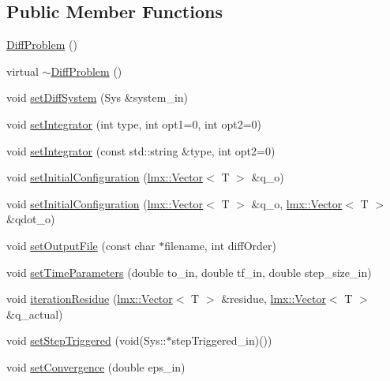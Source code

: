 \subsection*{Public Member Functions}
\begin{DoxyCompactItemize}
\item 
\hyperlink{classlmx_1_1DiffProblem_a33d21e901331098181a7403e22694058}{Diff\-Problem} ()
\item 
virtual \hyperlink{classlmx_1_1DiffProblem_a80661c86ad22e8ee27bae92859f6dd91}{$\sim$\-Diff\-Problem} ()
\item 
void \hyperlink{classlmx_1_1DiffProblem_a044719996388c68d07b0296f5097c83c}{set\-Diff\-System} (Sys \&system\-\_\-in)
\item 
void \hyperlink{classlmx_1_1DiffProblem_a668f2d36f68d2bf4a7047ab371cc3613}{set\-Integrator} (int type, int opt1=0, int opt2=0)
\item 
void \hyperlink{classlmx_1_1DiffProblem_aaa04d6f928a27a6c8ff4d7afee9d845a}{set\-Integrator} (const std\-::string \&type, int opt2=0)
\item 
void \hyperlink{classlmx_1_1DiffProblem_a61dcb7fdf68cdd5a93a1c756d5fbbba2}{set\-Initial\-Configuration} (\hyperlink{classlmx_1_1Vector}{lmx\-::\-Vector}$<$ T $>$ \&q\-\_\-o)
\item 
void \hyperlink{classlmx_1_1DiffProblem_a6dbf90e487205bbeeeb2a9537ff1df11}{set\-Initial\-Configuration} (\hyperlink{classlmx_1_1Vector}{lmx\-::\-Vector}$<$ T $>$ \&q\-\_\-o, \hyperlink{classlmx_1_1Vector}{lmx\-::\-Vector}$<$ T $>$ \&qdot\-\_\-o)
\item 
void \hyperlink{classlmx_1_1DiffProblem_a0cc21d6f547367b41e2292db9ea9d3a3}{set\-Output\-File} (const char $\ast$filename, int diff\-Order)
\item 
void \hyperlink{classlmx_1_1DiffProblem_aaef515c456107dc7c3def7efb69df1fe}{set\-Time\-Parameters} (double to\-\_\-in, double tf\-\_\-in, double step\-\_\-size\-\_\-in)
\item 
void \hyperlink{classlmx_1_1DiffProblem_aed737f137c8669b08c905fbb635191ea}{iteration\-Residue} (\hyperlink{classlmx_1_1Vector}{lmx\-::\-Vector}$<$ T $>$ \&residue, \hyperlink{classlmx_1_1Vector}{lmx\-::\-Vector}$<$ T $>$ \&q\-\_\-actual)
\item 
void \hyperlink{classlmx_1_1DiffProblem_ae6db21b8e645b38706737bc302e64447}{set\-Step\-Triggered} (void(Sys\-::$\ast$step\-Triggered\-\_\-in)())
\item 
void \hyperlink{classlmx_1_1DiffProblem_aa85b140d95fb966f444845fcb02c5b8d}{set\-Convergence} (double eps\-\_\-in)

\end{DoxyCompactItemize}
